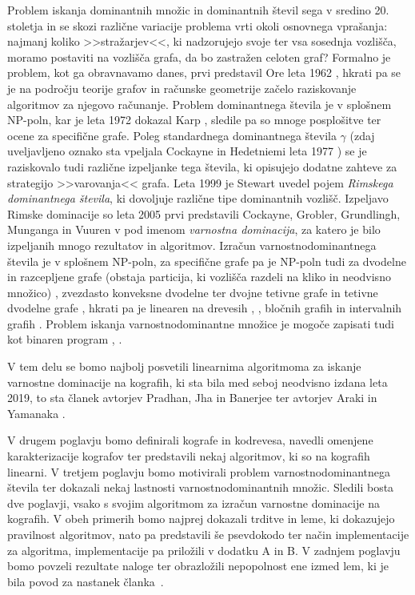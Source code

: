\documentclass[12pt,a4paper,twoside]{article}
\theoremstyle{definition} %
\theoremstyle{plain} %
\numberwithin{equation}{section}  %
\begin{document}
Problem iskanja dominantnih množic in dominantnih števil sega v sredino 20. stoletja in se skozi različne variacije problema vrti okoli osnovnega vprašanja: najmanj koliko >>stražarjev<<, ki nadzorujejo svoje ter vsa sosednja vozlišča, moramo postaviti na vozlišča grafa, da bo zastražen celoten graf? Formalno je problem, kot ga obravnavamo danes, prvi predstavil Ore leta 1962 \cite{ore1962theory}, hkrati pa se je na področju teorije grafov in računske geometrije začelo raziskovanje algoritmov za njegovo računanje. Problem dominantnega števila je v splošnem NP-poln, kar je leta 1972 dokazal Karp \cite{karp1972reducibility}, sledile pa so mnoge posplošitve ter ocene za specifične grafe.  Poleg standardnega dominantnega števila $\gamma$ (zdaj uveljavljeno oznako sta vpeljala Cockayne in Hedetniemi leta 1977 \cite{cockayne1977towards})  se je raziskovalo tudi različne izpeljanke tega števila, ki opisujejo dodatne zahteve za strategijo >>varovanja<< grafa. Leta 1999 je Stewart \cite{stewart1999defend} uvedel pojem \emph{Rimskega dominantnega števila}, ki dovoljuje različne tipe dominantnih vozlišč. Izpeljavo Rimske dominacije so leta 2005 prvi predstavili Cockayne, Grobler, Grundlingh, Munganga in Vuuren v \cite{cockayne2005protection} pod imenom \emph{varnostna dominacija}, za katero je bilo izpeljanih mnogo rezultatov in algoritmov. Izračun varnostnodominantnega števila je v splošnem NP-poln, za specifične grafe pa je NP-poln tudi za dvodelne in razcepljene grafe (obstaja particija, ki vozlišča razdeli na kliko in neodvisno množico) \cite{merouane2015secure}, zvezdasto konveksne dvodelne ter dvojne tetivne grafe \cite{wang2018complexity} in tetivne dvodelne grafe \cite{pradhan2018computing}, hkrati pa je linearen na drevesih  \cite{burger2014linear}, \cite{li2017secure}, bločnih grafih \cite{pradhan2018computing} in intervalnih grafih \cite{araki2018secure}. Problem iskanja varnostnodominantne množice je mogoče zapisati tudi kot binaren program \cite{burdett2020improved}, \cite{burger2013binary}.

V tem delu se bomo najbolj posvetili linearnima algoritmoma za iskanje varnostne dominacije na kografih, ki sta bila med seboj neodvisno izdana leta 2019, to sta članek avtorjev Pradhan, Jha in Banerjee \cite{jha2019secure} ter avtorjev Araki in Yamanaka \cite{araki2019secure}.

\medskip
V drugem poglavju bomo definirali kografe in kodrevesa, navedli omenjene karakterizacije kografov ter predstavili nekaj algoritmov, ki so na kografih linearni. V tretjem poglavju bomo motivirali problem varnostnodominantnega števila ter dokazali nekaj lastnosti varnostnodominantnih množic. Sledili bosta dve poglavji, vsako s svojim algoritmom za izračun varnostne dominacije na kografih. V obeh primerih bomo najprej dokazali trditve in leme, ki dokazujejo pravilnost algoritmov, nato pa predstavili še psevdokodo ter način implementacije za algoritma, implementacije pa priložili v dodatku A in B. V zadnjem poglavju bomo povzeli rezultate naloge ter obrazložili nepopolnost ene izmed lem, ki je bila povod za nastanek članka~\cite{kisek2020onJha}.
\end{document}
